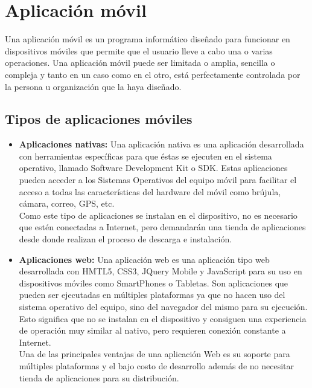 \section{Aplicación móvil}
Una aplicación móvil es un programa informático diseñado para funcionar en dispositivos móviles que permite que el usuario lleve a cabo una o varias operaciones. Una aplicación móvil puede ser limitada o amplia, sencilla o compleja y tanto en un caso como en el otro, está perfectamente controlada por la persona u organización que la haya diseñado. \cite{gardnerApp} \\

\subsection{Tipos de aplicaciones móviles}
\begin{itemize}
	\item \textbf{Aplicaciones nativas:} Una aplicación nativa es una aplicación desarrollada con herramientas específicas para que éstas se ejecuten en el sistema operativo, llamado Software Development Kit o SDK. Estas aplicaciones pueden acceder a los Sistemas Operativos del equipo móvil para facilitar el acceso a todas las características del hardware del móvil como brújula, cámara, correo, GPS, etc. \\ 
	
	Como este tipo de aplicaciones se instalan en el dispositivo, no es necesario que estén  conectadas a Internet, pero demandarán una tienda de aplicaciones desde donde realizan el proceso de descarga e instalación. \\
	
	\item \textbf{Aplicaciones web:} Una aplicación web es una aplicación tipo web desarrollada con HMTL5, CSS3, JQuery Mobile y JavaScript para su uso en dispositivos móviles como SmartPhones o Tabletas. Son aplicaciones que pueden ser ejecutadas en múltiples plataformas ya que no hacen uso del sistema operativo del equipo, sino del navegador del mismo para su ejecución. Esto significa que no se instalan en el dispositivo y consiguen una experiencia de operación muy similar al nativo, pero requieren conexión constante a Internet. \\
	
	Una de las principales ventajas de una aplicación Web es su soporte para múltiples plataformas y el bajo costo de desarrollo además de no necesitar tienda de aplicaciones para su distribución. \cite{ibmApp} \cite{demetrio2013} \cite{mobileApps2014}
	
\end{itemize}